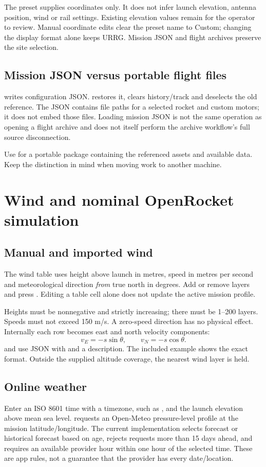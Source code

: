 The preset supplies coordinates only. It does not infer launch elevation,
antenna position, wind or rail settings. Existing elevation values remain for
the operator to review. Manual coordinate edits clear the preset name to Custom;
changing the display format alone keeps URRG. Mission JSON and flight archives
preserve the site selection.

\subsection{Mission JSON versus portable flight files}
 writes configuration JSON.  restores it,
clears history/track and deselects the old reference. The JSON contains file
paths for a selected rocket and custom motors; it does not embed those files.
Loading mission JSON is not the same operation as opening a flight archive and
does not itself perform the archive workflow's full source disconnection.

Use  for a portable package containing the referenced assets
and available data. Keep the distinction in mind when moving work to another
machine.

\section{Wind and nominal OpenRocket simulation}\label{sec:simulation}
\subsection{Manual and imported wind}
The wind table uses height above launch in metres, speed in metres per second
and meteorological direction \emph{from} true north in degrees. Add or remove
layers and press . Editing a table cell alone does not update the
active mission profile.

Heights must be nonnegative and strictly increasing; there must be 1--200 layers.
Speeds must not exceed 150 m/s. A zero-speed direction has no physical effect.
Internally each row becomes east and north velocity components:
\[
 v_E=-s\sin\theta,\qquad v_N=-s\cos\theta .
\]
 and  use JSON with  and a
 description. The included example shows the exact format.
Outside the supplied altitude coverage, the nearest wind layer is held.

\subsection{Online weather}
Enter an ISO 8601 time with a timezone, such as
, and the launch elevation above mean sea level.
 requests an Open-Meteo pressure-level profile at the mission
latitude/longitude. The current implementation selects forecast or historical
forecast based on age, rejects requests more than 15 days ahead, and requires
an available provider hour within one hour of the selected time. These are app
rules, not a guarantee that the provider has every date/location.

